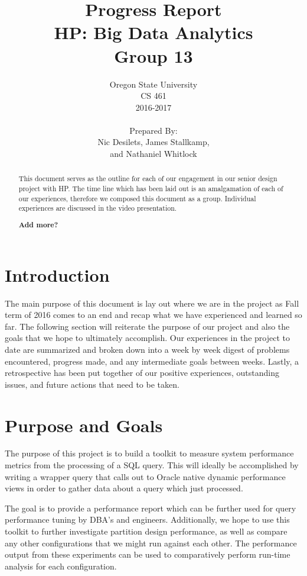 \documentclass[draftclsnofoot, onecolumn, compsoc, 10pt]{IEEEtran}
\title{\Huge Progress Report\\\large HP: Big Data Analytics\\Group 13}
\author{Oregon State University\\CS 461\\2016-2017\\\\Prepared By:\\Nic Desilets, James Stallkamp,\\and Nathaniel Whitlock}
\begin{document}
\begin{titlingpage}
    \maketitle 
    
    \vspace{1in}
    \begin{abstract}
		\noindent This document serves as the outline for each of our engagement in our senior design project with HP.
        The time line which has been laid out is an amalgamation of each of our experiences, therefore we composed this document as a group.
        Individual experiences are discussed in the video presentation.
        
        \textbf{Add more?}
    \end{abstract}
\end{titlingpage}

{\small\tableofcontents} %
\pagebreak

\section{Introduction}
The main purpose of this document is lay out where we are in the project as Fall term of 2016 comes to an end and recap what we have experienced and learned so far.
The following section will reiterate the purpose of our project and also the goals that we hope to ultimately accomplish.
Our experiences in the project to date are summarized and broken down into a week by week digest of problems encountered, progress made, and any intermediate goals between weeks.
Lastly, a retrospective has been put together of our positive experiences, outstanding issues, and future actions that need to be taken. 

\section{Purpose and Goals}
The purpose of this project is to build a toolkit to measure system performance metrics from the processing of a SQL query.
This will ideally be accomplished by writing a wrapper query that calls out to Oracle native dynamic performance views in order to gather data about a query which just processed.

The goal is to provide a performance report which can be further used for query performance tuning by DBA's and engineers.
Additionally, we hope to use this toolkit to further investigate partition design performance, as well as compare any other configurations that we might run against each other.
The performance output from these experiments can be used to comparatively perform run-time analysis for each configuration.
\end{document}
